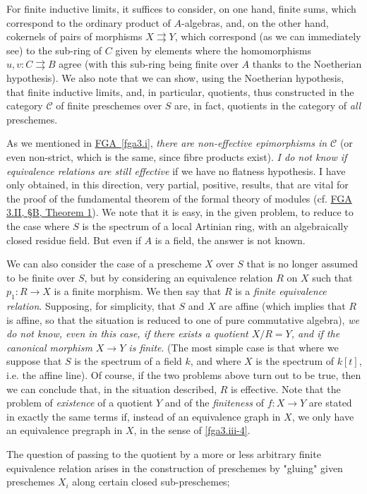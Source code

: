   For finite inductive limits, it suffices to consider, on one hand, finite sums, which correspond to the ordinary product of \(A\)-algebras, and, on the other hand, cokernels of pairs of morphisms \(X\rightrightarrows  Y\), which correspond (as we can immediately see) to the sub-ring of \(C\) given by elements where the homomorphisms \(u,v\colon  C\rightrightarrows  B\) agree (with this sub-ring being finite over \(A\) thanks to the Noetherian hypothesis).
  We also note that we can show, using the Noetherian hypothesis, that finite inductive limits, and, in particular, quotients, thus constructed in the category \(\mathcal {C}\) of finite preschemes over \(S\) are, in fact, quotients in the category of \emph{all} preschemes.\par{}As we mentioned in \hyperref[fga3.i]{FGA~\ref*{fga3.i}}, \emph{there are non-effective epimorphisms in \(\mathcal {C}\)} (or even non-strict, which is the same, since fibre products exist).
  \emph{I do not know if equivalence relations are still effective} if we have no flatness hypothesis.
  I have only obtained, in this direction, very partial, positive, results, that are vital for the proof of the fundamental theorem of the formal theory of modules (cf. \hyperref[fga3.ii-b-theorem-1]{FGA 3.II, §B, Theorem 1}).
  We note that it is easy, in the given problem, to reduce to the case where \(S\) is the spectrum of a local Artinian ring, with an algebraically closed residue field.
  But even if \(A\) is a field, the answer is not known.\par{}We can also consider the case of a prescheme \(X\) over \(S\) that is no longer assumed to be finite over \(S\), but by considering an equivalence relation \(R\) on \(X\) such that \(p_1\colon  R\to  X\) is a finite morphism.
  We then say that \(R\) is a \emph{finite equivalence relation}.
  Supposing, for simplicity, that \(S\) and \(X\) are affine (which implies that \(R\) is affine, so that the situation is reduced to one of pure commutative algebra), \emph{we do not know, even in this case, if there exists a quotient \(X/R=Y\), and if the canonical morphism \(X\to  Y\) is finite}.
  (The most simple case is that where we suppose that \(S\) is the spectrum of a field \(k\), and where \(X\) is the spectrum of \(k[t]\), i.e. the affine line).
  Of course, if the two problems above turn out to be true, then we can conclude that, in the situation described, \(R\) is effective.
  Note that the problem of \emph{existence} of a quotient \(Y\) and of the \emph{finiteness} of \(f\colon  X\to  Y\) are stated in exactly the same terms if, instead of an equivalence graph in \(X\), we only have an equivalence pregraph in \(X\), in the sense of \cref{fga3.iii-4}.\par{}The question of passing to the quotient by a more or less arbitrary finite equivalence relation arises in the construction of preschemes by "gluing" given preschemes \(X_i\) along certain closed sub-preschemes;
